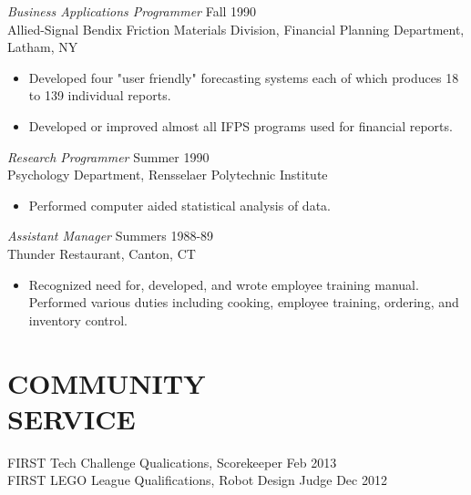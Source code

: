 \documentclass[line,margin]{res}
\begin{document}
\begin{resume}
		{\sl Business Applications Programmer} \hfill Fall 1990 \\
                Allied-Signal Bendix Friction Materials Division, 
                Financial Planning Department, Latham, NY
                 \begin{itemize}  \itemsep -2pt %
                 \item Developed four "user friendly" forecasting 
                    systems each of which produces 18 to 139 
                    individual reports. 
                \item   Developed or improved almost all IFPS 
                    programs used for financial reports. 
                \end{itemize}
 
                {\sl Research Programmer} \hfill            Summer 1990 \\
                Psychology Department, Rensselaer Polytechnic 
                Institute 
                 \begin{itemize}  \itemsep -2pt %
                 \item Performed computer aided statistical analysis 
                    of data. 
                 \end{itemize} 
                {\sl Assistant Manager} \hfill        Summers 1988-89 \\
                Thunder Restaurant, Canton, CT
                  \begin{itemize}
                   \item Recognized need for, developed, and wrote 
                    employee training manual. Performed various 
                    duties including cooking, employee training, 
                    ordering, and inventory control. 
                   \end{itemize} 
 
\section{COMMUNITY \\ SERVICE}  
                FIRST Tech Challenge Qualications, Scorekeeper \hfill Feb 2013 \\
		FIRST LEGO League Qualifications, Robot Design Judge \hfill Dec 2012 
	

\end{resume}
\end{document}
